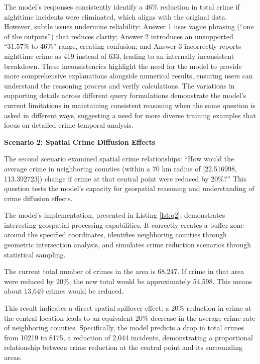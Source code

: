 The model's responses consistently identify a 46\% reduction in total crime if nighttime incidents were eliminated, which aligns with the original data. However, subtle issues undermine reliability: Answer 1 uses vague phrasing (``one of the outputs'') that reduces clarity; Answer 2 introduces an unsupported ``31.57\% to 46\%'' range, creating confusion; and Answer 3 incorrectly reports nighttime crime as 419 instead of 633, leading to an internally inconsistent breakdown. These inconsistencies highlight the need for the model to provide more comprehensive explanations alongside numerical results, ensuring users can understand the reasoning process and verify calculations. The variations in supporting details across different query formulations demonstrate the model's current limitations in maintaining consistent reasoning when the same question is asked in different ways, suggesting a need for more diverse training examples that focus on detailed crime temporal analysis.


\noindent \textbf{Scenario 2: Spatial Crime Diffusion Effects}  %

The second scenario examined spatial crime relationships: ``How would the average crime in neighboring counties (within a 70 km radius of [22.516998, 113.392723]) change if crime at that central point were reduced by 20\%?'' This question tests the model's capacity for geospatial reasoning and understanding of crime diffusion effects.

The model's implementation, presented in Listing \ref{lst:q2}, demonstrates interesting geospatial processing capabilities. It correctly creates a buffer zone around the specified coordinates, identifies neighboring counties through geometric intersection analysis, and simulates crime reduction scenarios through statistical sampling.



\begin{tcolorbox}[colback=white!95!black, colframe=black, title=Q2 Response, fontupper=\scriptsize, boxsep=2pt, left=3pt, right=3pt]
  The current total number of crimes in the area is 68,247. If crime in that area were reduced by 20\%, the new total would be approximately 54,598. This means about 13,649 crimes would be reduced.
\end{tcolorbox}

This result indicates a direct spatial spillover effect: a 20\% reduction in crime at the central location leads to an equivalent 20\% decrease in the average crime rate of neighboring counties. Specifically, the model predicts a drop in total crimes from 10219 to 8175, a reduction of 2,044 incidents, demonstrating a proportional relationship between crime reduction at the central point and its surrounding areas.


